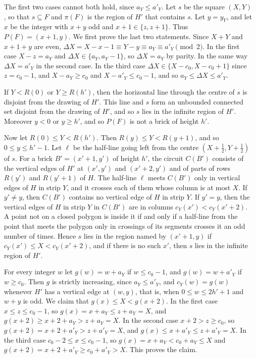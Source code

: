 {The first two cases cannot both hold, since $a_Y \le a'_Y$. Let $s$ be the square $(X, Y)$, so that $s \subseteq F$ and $\pi(F)$ is the region of $H'$ that contains $s$. Let $y = y_Y$, and let $x$ be the integer with $x + y$ odd and $x + 1 \in \{z, z + 1\}$. Thus $P(F) = (x + 1, y)$. We first prove the last two statements. Since $X + Y$ and $x + 1 + y$ are even, $\Delta X = X - x - 1 \equiv Y - y \equiv a_Y \equiv a'_Y \pmod 2$. In the first case $X - z = a_Y$ and $\Delta X \in \{a_Y, a_Y - 1\}$, so $\Delta X = a_Y$ by parity. In the same way $\Delta X = a'_Y$ in the second case. In the third case $\Delta X \in \{X - c_0, X - c_0 + 1\}$ since $z = c_0 - 1$, and $X - a_Y \ge c_0$ and $X - a'_Y \le c_0 - 1$, and so $a_Y \le \Delta X \le a'_Y$.

If $Y < R(0)$ or $Y \ge R(h')$, then the horizontal line through the centre of $s$ is disjoint from the drawing of $H'$. This line and $s$ form an unbounded connected set disjoint from the drawing of $H'$, and so $s$ lies in the infinite region of $H'$. Moreover $y < 0$ or $y \ge h'$, and so $P(F)$ is not a brick of height $h'$.

Now let $R(0) \le Y < R(h')$. Then $R(y) \le Y < R(y + 1)$, and so $0 \le y \le h' - 1$. Let $\ell$ be the half-line going left from the centre $(X + \frac{1}{2}, Y + \frac{1}{2})$ of $s$. For a brick $B' = (x' + 1, y')$ of height $h'$, the circuit $C(B')$ consists of the vertical edges of $H'$ at $(x', y')$ and $(x' + 2, y')$ and of parts of rows $R(y')$ and $R(y' + 1)$ of $H$. The half-line $\ell$ meets $C(B')$ only in vertical edges of $H$ in strip $Y$, and it crosses each of them whose column is at most $X$. If $y' \ne y$, then $C(B')$ contains no vertical edge of $H$ in strip $Y$. If $y' = y$, then the vertical edges of $H$ in strip $Y$ in $C(B')$ are in columns $c_Y(x') < c_Y(x' + 2)$. A point not on a closed polygon is inside it if and only if a half-line from the point that meets the polygon only in crossings of its segments crosses it an odd number of times. Hence $s$ lies in the region named by $(x' + 1, y)$ if $c_Y(x') \le X < c_Y(x' + 2)$, and if there is no such $x'$, then $s$ lies in the infinite region of $H'$.

For every integer $w$ let $g(w) = w + a_Y$ if $w \le c_0 - 1$, and $g(w) = w + a'_Y$ if $w \ge c_0$. Then $g$ is strictly increasing, since $a_Y \le a'_Y$, and $c_Y(w) = g(w)$ whenever $H'$ has a vertical edge at $(w, y)$, that is, when $0 \le w \le 2h' + 1$ and $w + y$ is odd. We claim that $g(x) \le X < g(x + 2)$. In the first case $x \le z \le c_0 - 1$, so $g(x) = x + a_Y \le z + a_Y = X$, and $g(x + 2) \ge x + 2 + a_Y > z + a_Y = X$. In the second case $x + 2 > z \ge c_0$, so $g(x + 2) = x + 2 + a'_Y > z + a'_Y = X$, and $g(x) \le x + a'_Y \le z + a'_Y = X$. In the third case $c_0 - 2 \le x \le c_0 - 1$, so $g(x) = x + a_Y < c_0 + a_Y \le X$ and $g(x + 2) = x + 2 + a'_Y \ge c_0 + a'_Y > X$. This proves the claim.

}

